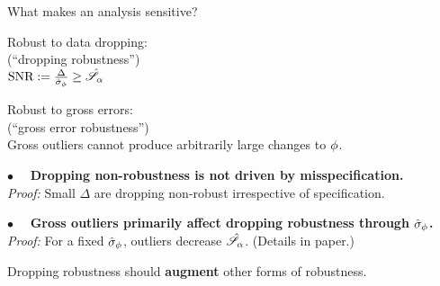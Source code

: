 
\begin{frame}[t]{What makes an analysis sensitive?}
%
\begin{minipage}[t]{0.45\textwidth}
\begin{center}
    Robust to data dropping:\\
    (``dropping robustness'')\\
    \vspace{1em}
    $\textrm{SNR} := \frac{\Delta}{\hat\sigma_{\phi}} \ge \hat{\mathscr{S}}_\alpha$
\end{center}
\end{minipage}
%
\begin{minipage}[t]{0.45\textwidth}
\begin{center}
    Robust to gross errors:\\
    (``gross error robustness'')\\
    \vspace{1em}
    Gross outliers cannot produce
    arbitrarily large changes to $\phi$.
\end{center}
\end{minipage}

\vspace{1em}
\hrulefill

\pause
\vspace{1em} $\bullet\quad$
\textbf{Dropping non-robustness is not driven by misspecification.\\}
\textit{Proof: }
Small $\Delta$ are dropping non-robust irrespective of specification.

\pause
\vspace{1em} $\bullet\quad$
\textbf{Gross outliers primarily affect dropping robustness through $\hat\sigma_{\phi}$.\\}
\textit{Proof: }
For a fixed $\hat\sigma_{\phi}$, outliers decrease $\hat{\mathscr{S}}_\alpha$.
(Details in paper.)

\pause
\hrulefill

\vspace{1em} Dropping robustness should \textbf{augment} other forms of
robustness.

\end{frame}






